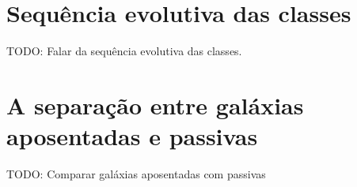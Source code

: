 \section{Sequência evolutiva das classes}

TODO: Falar da sequência evolutiva das classes.


\section{A separação entre galáxias aposentadas e passivas}

TODO: Comparar galáxias aposentadas com passivas



